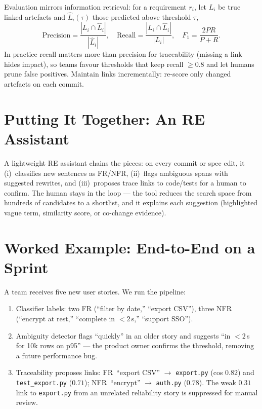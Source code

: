 Evaluation mirrors information retrieval: for a requirement $r_i$, let $L_i$ be true linked artefacts and $\hat L_i(\tau)$ those predicted above threshold $\tau$,
\[
  \text{Precision}=\frac{|L_i\cap\hat L_i|}{|\hat L_i|},\quad
  \text{Recall}=\frac{|L_i\cap\hat L_i|}{|L_i|},\quad
  F_1=\frac{2PR}{P+R}.
\]
In practice recall matters more than precision for traceability (missing a link hides impact), so teams favour thresholds that keep recall $\ge 0.8$ and let humans prune false positives. Maintain links incrementally: re-score only changed artefacts on each commit.

\section{Putting It Together: An RE Assistant}\label{sec:re-assistant}
A lightweight RE assistant chains the pieces: on every commit or spec edit, it (i)~classifies new sentences as FR/NFR, (ii)~flags ambiguous spans with suggested rewrites, and (iii)~proposes trace links to code/tests for a human to confirm. The human stays in the loop --- the tool reduces the search space from hundreds of candidates to a shortlist, and it explains each suggestion (highlighted vague term, similarity score, or co-change evidence).

\section{Worked Example: End-to-End on a Sprint}\label{sec:req-worked}
A team receives five new user stories. We run the pipeline:

\begin{enumerate}[leftmargin=1.2em, itemsep=0.3em]
  \item Classifier labels: two FR (``filter by date,'' ``export CSV''), three NFR (``encrypt at rest,'' ``complete in $<2$\,s,'' ``support SSO'').
  \item Ambiguity detector flags ``quickly'' in an older story and suggests ``in $<2$\,s for 10k rows on p95'' --- the product owner confirms the threshold, removing a future performance bug.
  \item Traceability proposes links: FR~``export CSV'' $\to$ \texttt{export.py} (cos $0.82$) and \texttt{test\_export.py} ($0.71$); NFR~``encrypt'' $\to$ \texttt{auth.py} ($0.78$). The weak $0.31$ link to \texttt{export.py} from an unrelated reliability story is suppressed for manual review.
\end{enumerate}


